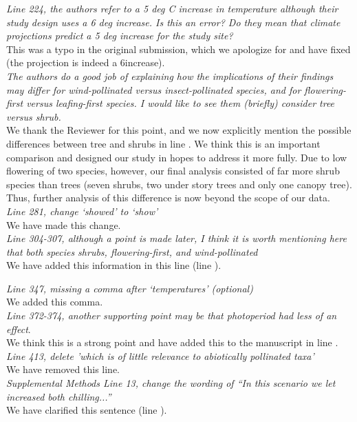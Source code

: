 \documentclass[11pt]{article}
\begin{document}
\emph{Line 224, the authors refer to a 5 deg C increase in temperature although their study design uses a 6 deg increase. Is this an error? Do they mean that climate projections predict a 5 deg increase for the study site?}\\

\noindent This was a typo in the original submission, which we apologize for and have fixed (the projection is indeed a 6\degree increase).\\

\emph{The authors do a good job of explaining how the implications of their findings may differ for wind-pollinated versus insect-pollinated species, and for flowering-first versus leafing-first species. I would like to see them (briefly) consider tree versus shrub.}\\

\noindent We thank the Reviewer for this point, and we now explicitly mention the possible differences between tree and shrubs in line . We think this is an important comparison and designed our study in hopes to address it more fully. Due to low flowering of two species, however, our final analysis consisted of far more shrub species than trees (seven shrubs, two under story trees and only one canopy tree). Thus, further analysis of this difference is now beyond the scope of our data.\\ 

\emph{Line 281, change `showed' to `show'}\\

\noindent We have made this change.\\

\emph{Line 304-307, although a point is made later, I think it is worth mentioning here that both species shrubs, flowering-first, and wind-pollinated}\\

\noindent We have added this information in this line (line ).

\emph{Line 347, missing a comma after `temperatures' (optional)}\\

\noindent We added this comma.\\

\emph{Line 372-374, another supporting point may be that photoperiod had less of an effect}.\\

\noindent We think this is a strong point and have added this to the manuscript in line .\\


\emph{Line 413, delete 'which is of little relevance to abiotically pollinated taxa'}\\

\noindent We have removed this line.\\

\emph{Supplemental Methods Line 13, change the wording of ``In this scenario we let increased both chilling...''}\\

\noindent We have clarified this sentence (line ). \\

 
\end{document}
